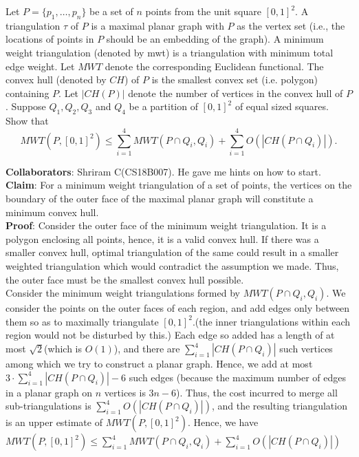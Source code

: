 \documentclass[solution,12pt]{exam}
\begin{document}
\begin{questions}
\question[8]   Let $P = \{p_1,\ldots, p_n\}$ be a set of $n$ points from the unit square $[0,1]^2$. A triangulation $\tau$ of $P$ is a maximal planar graph with $P$ as the vertex set (i.e., the locations of points in $P$ should be an embedding of the graph). A minimum weight triangulation (denoted by mwt) is a triangulation with minimum total edge weight.  Let $MWT$ denote the corresponding Euclidean functional. The convex hull (denoted by $CH$) of $P$ is the smallest convex set (i.e. polygon) containing $P$. Let $|CH(P)|$ denote the number of vertices in the convex hull of $P$.  Suppose $Q_1,Q_2, Q_3$ and $Q_4$ be a partition of $[0,1]^2$ of equal sized squares. Show that
$$ MWT(P, [0,1]^2) \le \sum_{i=1}^4 MWT(P\cap Q_i, Q_i) + \sum_{i=1}^4 O(|CH(P\cap Q_i)|).$$
\begin{solution}
	
	{\bf Collaborators}: Shriram C(CS18B007). He gave me hints on how to start. \\
	\textbf{Claim}: For a minimum weight triangulation of a set of points, the vertices on the boundary of the outer face of the maximal planar graph will constitute a minimum convex hull.
	\\
	\textbf{Proof}: Consider the outer face of the minimum weight triangulation. It is a polygon enclosing all points, hence, it is a valid convex hull. If there was a smaller convex hull, optimal triangulation of the same could result in a smaller weighted triangulation which would contradict the assumption we made. Thus, the outer face must be the smallest convex hull possible.
	\\
	Consider the minimum weight triangulations formed by $MWT(P \cap Q_i,Q_i)$. We consider the points on the outer faces of each region, and add edges only between them so as to maximally triangulate $[0,1]^2$.(the inner triangulations within each region would not be disturbed by this.) Each edge so added has a length of at most $\sqrt{2}$(which is $O(1)$), and there are $\sum\limits_{i=1}^{4} |CH(P \cap Q_i)|$ such vertices among which we try to construct a planar graph. Hence, we add at most $3\cdot \sum\limits_{i=1}^{4} |CH(P\cap Q_i)| - 6$ such edges (because the maximum number of edges in a planar graph on $n$ vertices is $3n-6$). Thus, the cost incurred to merge all sub-triangulations is $\sum\limits_{i=1}^{4}O(|CH( P\cap Q_i)|)$, and the resulting triangulation is an upper estimate of $MWT(P,[0,1]^2)$. Hence, we have $MWT(P,[0,1]^2) \leq \sum\limits_{i=1}^{4} MWT(P\cap Q_i,Q_i) + \sum\limits_{i=1}^{4}O(|CH(P \cap Q_i)|)$
	

\end{solution}
\end{questions}
\end{document}
